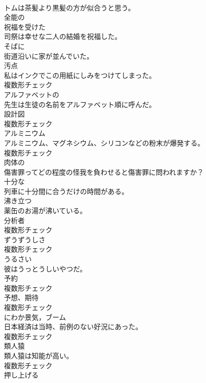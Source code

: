 \documentclass[8pt]{extreport}
\begin{document}
\begin{CJK}{UTF8}{min}
\\	トムは茶髪より黒髪の方が似合うと思う。	
\\	[形容詞]	全能の	
\\	[形容詞]	祝福を受けた	
\\	司祭は幸せな二人の結婚を祝福した。	
\\	[副詞]	そばに	
\\	街道沿いに家が並んでいた。	
\\	[名詞]	汚点	
\\	私はインクでこの用紙にしみをつけてしまった。	
\\	複数形チェック
\\	[形容詞]	アルファベットの	
\\	先生は生徒の名前をアルファベット順に呼んだ。	
\\	[名詞]	設計図	
\\	複数形チェック
\\	[名詞]	アルミニウム	
\\	アルミニウム、マグネシウム、シリコンなどの粉末が爆発する。	
\\	複数形チェック
\\	[形容詞]	肉体の	
\\	傷害罪ってどの程度の怪我を負わせると傷害罪に問われますか？	
\\	[形容詞]	十分な	
\\	列車に十分間に合うだけの時間がある。	
\\	[形容詞]	沸き立つ	
\\	薬缶のお湯が沸いている。	
\\	[名詞]	分析者	
\\	複数形チェック
\\	[名詞]	ずうずうしさ	
\\	複数形チェック
\\	[形容詞]	うるさい	
\\	彼はうっとうしいやつだ。	
\\	[名詞]	予約	
\\	複数形チェック
\\	[名詞]	予想、期待	
\\	複数形チェック
\\	[名詞]	にわか景気，ブーム	
\\	日本経済は当時、前例のない好況にあった。	
\\	複数形チェック
\\	[名詞]	類人猿	
\\	類人猿は知能が高い。	
\\	複数形チェック
\\	[動詞]	押し上げる	

\end{CJK}
\end{document}
